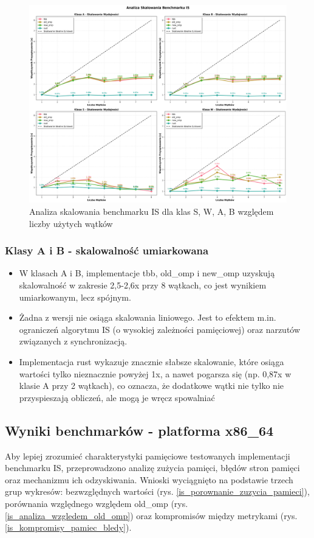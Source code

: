 \begin{figure}[H]
    \centering
    \includegraphics[width=\textwidth]{analiza/images/parallel/is/is_analiza_skalowania.png}
    \caption{Analiza skalowania benchmarku IS dla klas S, W, A, B względem liczby użytych wątków}
    \label{ip_analiza_skalowania}
\end{figure}
\subsubsection{Klasy A i B - skalowalność umiarkowana}
\begin{itemize}
    \item W klasach A i B, implementacje tbb, old\_omp i new\_omp uzyskują skalowalność w zakresie 2,5-2,6x przy 8 wątkach, co jest wynikiem umiarkowanym, lecz spójnym.
    \item Żadna z wersji nie osiąga skalowania liniowego. Jest to efektem m.in. ograniczeń algorytmu IS (o wysokiej zależności pamięciowej) oraz narzutów związanych z synchronizacją.
    \item Implementacja rust wykazuje znacznie słabsze skalowanie, które osiąga wartości tylko nieznacznie powyżej 1x, a nawet pogarsza się (np. 0,87x w klasie A przy 2 wątkach), co oznacza, że dodatkowe wątki nie tylko nie przyspieszają obliczeń, ale mogą je wręcz spowalniać
\end{itemize}


\subsection{Wyniki benchmarków - platforma x86\_64}
Aby lepiej zrozumieć charakterystyki pamięciowe testowanych implementacji benchmarku IS, przeprowadzono analizę zużycia pamięci, błędów stron pamięci oraz mechanizmu ich odzyskiwania. Wnioski wyciągnięto na podstawie trzech grup wykresów: bezwzględnych wartości (rys. \ref{is_porownanie_zuzycia_pamieci}), porównania względnego względem old\_omp (rys. \ref{is_analiza_wzgledem_old_omp}) oraz kompromisów między metrykami (rys. \ref{is_kompromisy_pamiec_bledy}).
